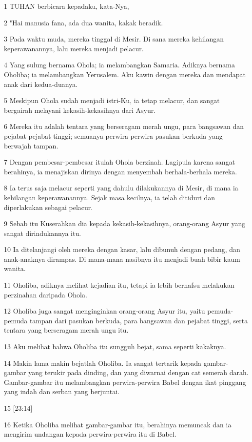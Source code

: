\par 1 TUHAN berbicara kepadaku, kata-Nya,
\par 2 "Hai manusia fana, ada dua wanita, kakak beradik.
\par 3 Pada waktu muda, mereka tinggal di Mesir. Di sana mereka kehilangan keperawanannya, lalu mereka menjadi pelacur.
\par 4 Yang sulung bernama Ohola; ia melambangkan Samaria. Adiknya bernama Oholiba; ia melambangkan Yerusalem. Aku kawin dengan mereka dan mendapat anak dari kedua-duanya.
\par 5 Meskipun Ohola sudah menjadi istri-Ku, ia tetap melacur, dan sangat bergairah melayani kekasih-kekasihnya dari Asyur.
\par 6 Mereka itu adalah tentara yang berseragam merah ungu, para bangsawan dan pejabat-pejabat tinggi; semuanya perwira-perwira pasukan berkuda yang berwajah tampan.
\par 7 Dengan pembesar-pembesar itulah Ohola berzinah. Lagipula karena sangat berahinya, ia menajiskan dirinya dengan menyembah berhala-berhala mereka.
\par 8 Ia terus saja melacur seperti yang dahulu dilakukannya di Mesir, di mana ia kehilangan keperawanannya. Sejak masa kecilnya, ia telah ditiduri dan diperlakukan sebagai pelacur.
\par 9 Sebab itu Kuserahkan dia kepada kekasih-kekasihnya, orang-orang Asyur yang sangat dirindukannya itu.
\par 10 Ia ditelanjangi oleh mereka dengan kasar, lalu dibunuh dengan pedang, dan anak-anaknya dirampas. Di mana-mana nasibnya itu menjadi buah bibir kaum wanita.
\par 11 Oholiba, adiknya melihat kejadian itu, tetapi ia lebih bernafsu melakukan perzinahan daripada Ohola.
\par 12 Oholiba juga sangat menginginkan orang-orang Asyur itu, yaitu pemuda-pemuda tampan dari pasukan berkuda, para bangsawan dan pejabat tinggi, serta tentara yang berseragam merah ungu itu.
\par 13 Aku melihat bahwa Oholiba itu sungguh bejat, sama seperti kakaknya.
\par 14 Makin lama makin bejatlah Oholiba. Ia sangat tertarik kepada gambar-gambar yang terukir pada dinding, dan yang diwarnai dengan cat semerah darah. Gambar-gambar itu melambangkan perwira-perwira Babel dengan ikat pinggang yang indah dan serban yang berjuntai.
\par 15 [23:14]
\par 16 Ketika Oholiba melihat gambar-gambar itu, berahinya memuncak dan ia mengirim undangan kepada perwira-perwira itu di Babel.
